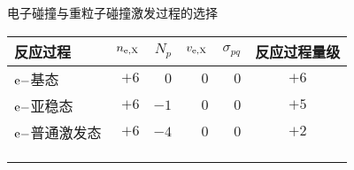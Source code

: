 \begin{CJK*}{UTF8}{kai}
\begin{frame}{电子碰撞与重粒子碰撞激发过程的选择}
\centering
\begin{table}%
\begin{center}
\begin{tabular}{lrrrrc}\toprule[1.5pt]
反应过程 & $n_{\rm e,X}$ & $N_{p}$ & $v_{\rm e,X}$ & $\sigma_{pq}$ & 反应过程量级\\
\midrule[1pt]
${\rm e-}$基态       & $+6$ & $0$  & $0$  & $0$  & $+6$ \\
${\rm e-}$亚稳态     & $+6$ & $-1$ & $0$  & $0$  & $+5$ \\
${\rm e-}$普通激发态 & $+6$ & $-4$ & $0$  & $0$  & $+2$ \\
\color{gray}{${\rm X-}$基态} & \color{gray}{$+4$} & \color{gray}{$0$}  & \color{gray}{$-3$} & \color{gray}{$-3$} & \color{gray}{$-2$} \\
\color{gray}{${\rm X-}$亚稳态}     & \color{gray}{$+4$} & \color{gray}{$-1$} & \color{gray}{$-3$} & \color{gray}{$-3$} & \color{gray}{$-3$} \\
\color{gray}{${\rm X-}$普通激发态} & \color{gray}{$+4$} & \color{gray}{$-4$} & \color{gray}{$-3$} & \color{gray}{$-3$} & \color{gray}{$-6$} \\
\bottomrule[1.5pt]
\end{tabular}
\end{center}
\end{table}
\end{frame}


\end{CJK*}
